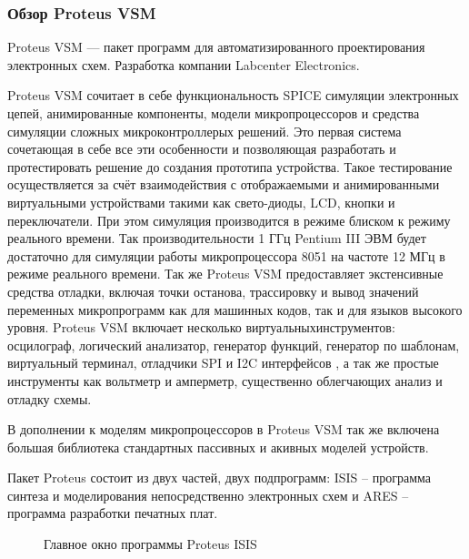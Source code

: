 \subsubsection{Обзор Proteus VSM}
\begin{par}
Proteus VSM --- пакет программ для автоматизированного проектирования электронных схем.
    Разработка компании Labcenter Electronics.
\end{par}
\begin{par}
Proteus VSM сочитает в себе функциональность SPICE симуляции электронных цепей,
анимированные компоненты, модели микропроцессоров и средства симуляции сложных
микроконтроллерых решений. Это первая система сочетающая в себе все эти особенности
и позволяющая разработать и протестировать решение до создания прототипа устройства.
Такое тестирование осуществляется за счёт взаимодействия с отображаемыми и анимированными
виртуальными устройствами такими как свето-диоды, LCD, кнопки и переключатели.
При этом симуляция производится в режиме блиском к режиму реального времени.
Так производительности 1 ГГц Pentium III ЭВМ будет достаточно для симуляции работы
микропроцессора 8051 на частоте 12 МГц в режиме реального времени. Так же Proteus VSM
предоставляет экстенсивные средства отладки, включая точки останова, трассировку и вывод
значений  переменных микропрограмм как для машинных кодов, так и для языков высокого
уровня. Proteus VSM  включает несколько виртуальныхинструментов: осцилограф, логический
анализатор, генератор функций, генератор по шаблонам, виртуальный терминал, отладчики SPI
и I2C интерфейсов , а так же простые инструменты как вольтметр и амперметр, существенно
облегчающих анализ и отладку схемы.
\end{par}
\begin{par}
В дополнении к моделям микропроцессоров в Proteus VSM так же включена большая библиотека
стандартных пассивных и акивных моделей устройств.
\end{par}
\begin{par}
Пакет Proteus состоит из двух частей, двух подпрограмм: ISIS – программа синтеза и
моделирования непосредственно электронных схем и ARES – программа разработки печатных
плат.

\begin{figure}[ht]
	\caption{Главное окно программы Proteus ISIS}
	\label{img:proteus}
\end{figure}

\end{par}

